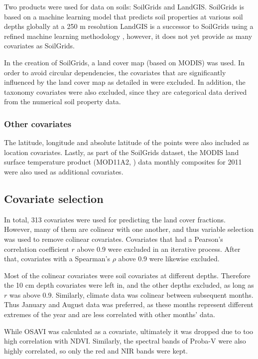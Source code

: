 \documentclass[a4paper,10pt]{article}
\begin{document}
Two products were used for data on soils: SoilGrids and LandGIS.
SoilGrids is based on a machine learning model that predicts soil properties at various soil depths globally at a 250 m resolution \citep{hengl_soilgrids250m_2017}
LandGIS is a successor to SoilGrids using a refined machine learning methodology \citep{hengl_predictive_2019}, however, it does not yet provide as many covariates as SoilGrids.

In the creation of SoilGrids, a land cover map (based on MODIS) was used.
In order to avoid circular dependencies, the covariates that are significantly influenced by the land cover map as detailed in \citet{hengl_soilgrids250m_2017} were excluded.
In addition, the taxonomy covariates were also excluded, since they are categorical data derived from the numerical soil property data.

\subsubsection{Other covariates}

The latitude, longitude and absolute latitude of the points were also included as location covariates.
Lastly, as part of the SoilGrids dataset, the MODIS land surface temperature product (MOD11A2, \citealp{wan_mod11a2_2015}) data monthly composites for 2011 were also used as additional covariates.

\subsection{Covariate selection}
\label{sec-covariate-selection}

In total, 313 covariates were used for predicting the land cover fractions.
However, many of them are colinear with one another, and thus variable selection was used to remove colinear covariates.
Covariates that had a Pearson's correlation coefficient $r$ above 0.9 were excluded in an iterative process.
After that, covariates with a Spearman's $\rho$ above 0.9 were likewise excluded.

Most of the colinear covariates were soil covariates at different depths.
Therefore the 10 cm depth covariates were left in, and the other depths excluded, as long as $r$ was above 0.9.
Similarly, climate data was colinear between subsequent months. Thus January and August data was preferred, as these months represent different extremes of the year and are less correlated with other months' data.

While \ac{OSAVI} was calculated as a covariate, ultimately it was dropped due to too high correlation with \ac{NDVI}.
Similarly, the spectral bands of Proba-V were also highly correlated, so only the red and \ac{NIR} bands were kept.
\end{document}
